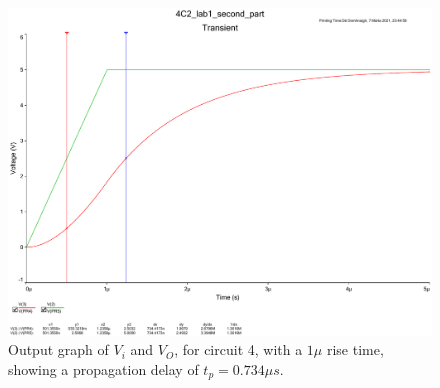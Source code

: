 \documentclass[11pt, a4paper]{article}
\begin{document}
\begin{figure}
  \centering
  \includegraphics[width=\textwidth]{report/img/question_4/rise_time_1u.pdf}
  \caption{\centering Output graph of $V_i$ and $V_O$, for circuit 4, with a $1\mu$ rise time, showing a propagation delay of $t_p = 0.734 \mu s$.}
    \label{fig:1rt}
\end{figure}
\end{document}

